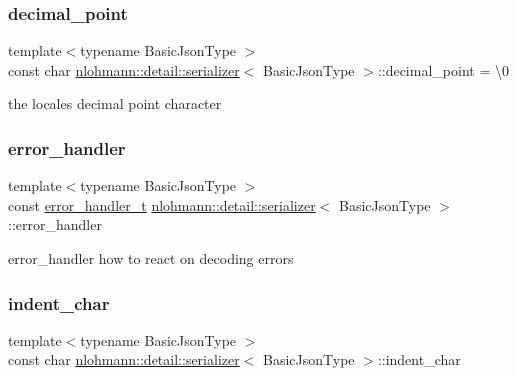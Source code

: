 \subsubsection{\texorpdfstring{decimal\+\_\+point}{decimal\_point}}
{\footnotesize\ttfamily template$<$typename Basic\+Json\+Type $>$ \\
const char \hyperlink{classnlohmann_1_1detail_1_1serializer}{nlohmann\+::detail\+::serializer}$<$ Basic\+Json\+Type $>$\+::decimal\+\_\+point = \textquotesingle{}\textbackslash{}0\textquotesingle{}\hspace{0.3cm}{\ttfamily [private]}}



the locale\textquotesingle{}s decimal point character 

\mbox{\label{classnlohmann_1_1detail_1_1serializer_a09d5a046fb0f7cb61977d6e5fbe8b3a1}} 
\subsubsection{\texorpdfstring{error\+\_\+handler}{error\_handler}}
{\footnotesize\ttfamily template$<$typename Basic\+Json\+Type $>$ \\
const \hyperlink{namespacenlohmann_1_1detail_a5a76b60b26dc8c47256a996d18d967df}{error\+\_\+handler\+\_\+t} \hyperlink{classnlohmann_1_1detail_1_1serializer}{nlohmann\+::detail\+::serializer}$<$ Basic\+Json\+Type $>$\+::error\+\_\+handler\hspace{0.3cm}{\ttfamily [private]}}



error\+\_\+handler how to react on decoding errors 

\mbox{\label{classnlohmann_1_1detail_1_1serializer_a9a55e6b028d09676fe35aefa0c72ea5b}} 
\subsubsection{\texorpdfstring{indent\+\_\+char}{indent\_char}}
{\footnotesize\ttfamily template$<$typename Basic\+Json\+Type $>$ \\
const char \hyperlink{classnlohmann_1_1detail_1_1serializer}{nlohmann\+::detail\+::serializer}$<$ Basic\+Json\+Type $>$\+::indent\+\_\+char\hspace{0.3cm}{\ttfamily [private]}}



